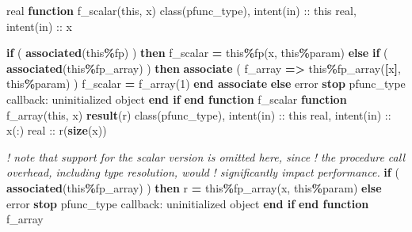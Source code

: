 \documentclass[
  paper=a4,
  ,captions=tableheading
]{scrartcl}
\newenvironment{Shaded}{\begin{snugshade}}{\end{snugshade}}
\newcommand{\CommentTok}[1]{\textcolor[rgb]{0.56,0.35,0.01}{\textit{#1}}}
\newcommand{\DataTypeTok}[1]{\textcolor[rgb]{0.13,0.29,0.53}{#1}}
\newcommand{\DecValTok}[1]{\textcolor[rgb]{0.00,0.00,0.81}{#1}}
\newcommand{\FunctionTok}[1]{\textcolor[rgb]{0.13,0.29,0.53}{\textbf{#1}}}
\newcommand{\KeywordTok}[1]{\textcolor[rgb]{0.13,0.29,0.53}{\textbf{#1}}}
\newcommand{\NormalTok}[1]{#1}
\newcommand{\OperatorTok}[1]{\textcolor[rgb]{0.81,0.36,0.00}{\textbf{#1}}}
\newcommand{\StringTok}[1]{\textcolor[rgb]{0.31,0.60,0.02}{#1}}
\begin{document}
\begin{Shaded}
\begin{Highlighting}[]
\DataTypeTok{real} \KeywordTok{function}\NormalTok{ f\_scalar(this, x)}
  \DataTypeTok{class(pfunc\_type)}\NormalTok{, }\DataTypeTok{intent(in)} \DataTypeTok{::}\NormalTok{ this}
  \DataTypeTok{real}\NormalTok{, }\DataTypeTok{intent(in)} \DataTypeTok{::}\NormalTok{ x}

  \KeywordTok{if}\NormalTok{ ( }\FunctionTok{associated}\NormalTok{(this}\OperatorTok{\%}\NormalTok{fp) ) }\KeywordTok{then}
\NormalTok{    f\_scalar }\KeywordTok{=}\NormalTok{ this}\OperatorTok{\%}\NormalTok{fp(x, this}\OperatorTok{\%}\NormalTok{param)}
  \KeywordTok{else} \KeywordTok{if}\NormalTok{ ( }\FunctionTok{associated}\NormalTok{(this}\OperatorTok{\%}\NormalTok{fp\_array) ) }\KeywordTok{then}
    \KeywordTok{associate}\NormalTok{ ( f\_array }\KeywordTok{=}\OperatorTok{\textgreater{}}\NormalTok{ this}\OperatorTok{\%}\NormalTok{fp\_array(}\KeywordTok{[}\NormalTok{x}\KeywordTok{]}\NormalTok{, this}\OperatorTok{\%}\NormalTok{param) )}
\NormalTok{      f\_scalar }\KeywordTok{=}\NormalTok{ f\_array(}\DecValTok{1}\NormalTok{)}
    \KeywordTok{end associate}
  \KeywordTok{else}
\NormalTok{    error }\KeywordTok{stop} \StringTok{\textquotesingle{}pfunc\_type callback: uninitialized object\textquotesingle{}}
  \KeywordTok{end if}
\KeywordTok{end function}\NormalTok{ f\_scalar}
\KeywordTok{function}\NormalTok{ f\_array(this, x) }\KeywordTok{result}\NormalTok{(r)}
  \DataTypeTok{class(pfunc\_type)}\NormalTok{, }\DataTypeTok{intent(in)} \DataTypeTok{::}\NormalTok{ this}
  \DataTypeTok{real}\NormalTok{, }\DataTypeTok{intent(in)} \DataTypeTok{::}\NormalTok{ x(:)}
  \DataTypeTok{real} \DataTypeTok{::}\NormalTok{ r(}\FunctionTok{size}\NormalTok{(x))}

  \CommentTok{! note that support for the scalar version is omitted here, since}
  \CommentTok{! the procedure call overhead, including type resolution, would}
  \CommentTok{! significantly impact performance.}
  \KeywordTok{if}\NormalTok{ ( }\FunctionTok{associated}\NormalTok{(this}\OperatorTok{\%}\NormalTok{fp\_array) ) }\KeywordTok{then}
\NormalTok{    r }\KeywordTok{=}\NormalTok{ this}\OperatorTok{\%}\NormalTok{fp\_array(x, this}\OperatorTok{\%}\NormalTok{param)}
  \KeywordTok{else}
\NormalTok{    error }\KeywordTok{stop} \StringTok{\textquotesingle{}pfunc\_type callback: uninitialized object\textquotesingle{}}
  \KeywordTok{end if}
\KeywordTok{end function}\NormalTok{ f\_array}
\end{Highlighting}
\end{Shaded}
\end{document}

